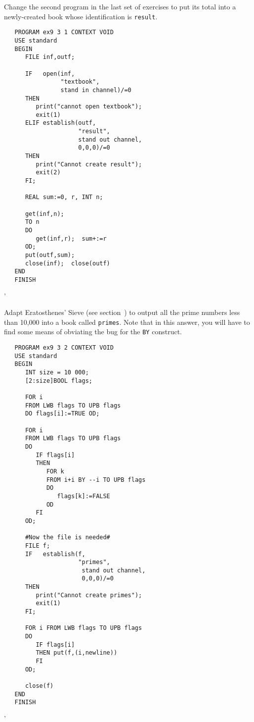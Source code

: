 \begin{exercise}
\item Change the second program in the last set of exercises to put its
total into a newly-created book whose identification is
\verb|result|. \ans \ %
\begin{verbatim}
   PROGRAM ex9 3 1 CONTEXT VOID
   USE standard
   BEGIN
      FILE inf,outf;

      IF   open(inf,
                "textbook",
                stand in channel)/=0
      THEN
         print("cannot open textbook");
         exit(1)
      ELIF establish(outf,
                     "result",
                     stand out channel,
                     0,0,0)/=0
      THEN
         print("Cannot create result");
         exit(2)
      FI;

      REAL sum:=0, r, INT n;

      get(inf,n);
      TO n
      DO
         get(inf,r);  sum+:=r
      OD;
      put(outf,sum);
      close(inf);  close(outf)
   END
   FINISH
\end{verbatim}
'
\item Adapt Eratosthenes' Sieve (see section~) to
output all the prime numbers less than 10,000 into a book called
\verb|primes|. \ans Note that in this answer, you will have to find
some means of obviating the  bug
for the \verb|BY| construct.
\begin{verbatim}
   PROGRAM ex9 3 2 CONTEXT VOID
   USE standard
   BEGIN
      INT size = 10 000;
      [2:size]BOOL flags;

      FOR i
      FROM LWB flags TO UPB flags
      DO flags[i]:=TRUE OD;

      FOR i
      FROM LWB flags TO UPB flags
      DO
         IF flags[i]
         THEN
            FOR k
            FROM i+i BY --i TO UPB flags
            DO
               flags[k]:=FALSE
            OD
         FI
      OD;

      #Now the file is needed#
      FILE f;
      IF   establish(f,
                     "primes",
                      stand out channel,
                      0,0,0)/=0
      THEN
         print("Cannot create primes");
         exit(1)
      FI;

      FOR i FROM LWB flags TO UPB flags
      DO
         IF flags[i]
         THEN put(f,(i,newline))
         FI
      OD;

      close(f)
   END
   FINISH
\end{verbatim}
'
\end{exercise}


